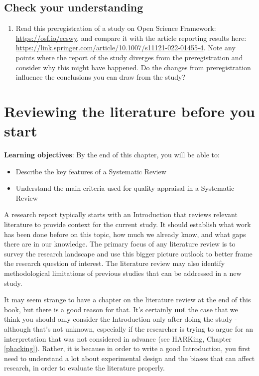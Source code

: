 \documentclass{krantz}
\providecommand{\tightlist}{%
\setlength{\itemsep}{0pt}\setlength{\parskip}{0pt}}
\begin{document}
\hypertarget{check-your-understanding-21}{%
\section{Check your understanding}\label{check-your-understanding-21}}

\begin{enumerate}
\def\labelenumi{\arabic{enumi}.}
\tightlist
\item
  Read this preregistration of a study on Open Science Framework: \url{https://osf.io/ecswy}, and compare it with the article reporting results here: \url{https://link.springer.com/article/10.1007/s11121-022-01455-4}. Note any points where the report of the study diverges from the preregistration and consider why this might have happened. Do the changes from preregistration influence the conclusions you can draw from the study?
\end{enumerate}

\hypertarget{litrev}{%
\chapter{Reviewing the literature before you start}\label{litrev}}

\textbf{Learning objectives}: By the end of this chapter, you will be able to:

\begin{itemize}
\item
  Describe the key features of a Systematic Review
\item
  Understand the main criteria used for quality appraisal in a Systematic Review
\end{itemize}

A research report typically starts with an Introduction that reviews relevant literature to provide context for the current study. It should establish what work has been done before on this topic, how much we already know, and what gaps there are in our knowledge. The primary focus of any literature review is to survey the research landscape and use this bigger picture outlook to better frame the research question of interest. The literature review may also identify methodological limitations of previous studies that can be addressed in a new study.

It may seem strange to have a chapter on the literature review at the end of this book, but there is a good reason for that. It's certainly \textbf{not} the case that we think you should only consider the Introduction only after doing the study - although that's not unknown, especially if the researcher is trying to argue for an interpretation that was not considered in advance (see HARKing, Chapter \ref{phacking}). Rather, it is because in order to write a good Introduction, you first need to understand a lot about experimental design and the biases that can affect research, in order to evaluate the literature properly.
\end{document}
